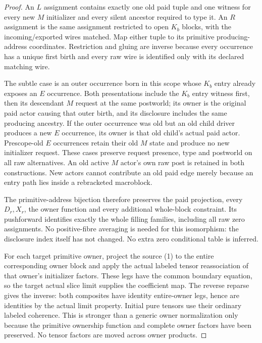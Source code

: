 \documentclass[11pt]{article}\usepackage{amsmath,amssymb,amsthm,geometry}\geometry{margin=1in}
\begin{document}
\begin{proof}
An $L$ assignment contains exactly one old paid tuple and one witness for every new $M$ initializer and every silent ancestor required to type it. An $R$ assignment is the same assignment restricted to open $K_b$ blocks, with the incoming/exported wires matched. Map either tuple to its primitive producing-address coordinates. Restriction and gluing are inverse because every occurrence has a unique first birth and every raw wire is identified only with its declared matching wire.

The subtle case is an outer occurrence born in this scope whose $K_b$ entry already exposes an $E$ occurrence. Both presentations include the $K_b$ entry witness first, then its descendant $M$ request at the same postworld; its owner is the original paid actor causing that outer birth, and its disclosure includes the same producing ancestry. If the outer occurrence was old but an old child driver produces a new $E$ occurrence, its owner is that old child's actual paid actor. Prescope-old $E$ occurrences retain their old $M$ state and produce no new initializer request. These cases preserve request presence, type and postworld on all raw alternatives. An old active $M$ actor's own raw post is retained in both constructions. New actors cannot contribute an old paid edge merely because an entry path lies inside a rebracketed macroblock.

The primitive-address bijection therefore preserves the paid projection, every $D_r,X_r$, the owner function and every additional whole-block constraint. Its pushforward identifies exactly the whole filling families, including all raw zero assignments. No positive-fibre averaging is needed for this isomorphism: the disclosure index itself has not changed. No extra zero conditional table is inferred.

For each target primitive owner, project the source (1) to the entire corresponding owner block and apply the actual labeled tensor reassociation of that owner's initializer factors. These legs have the common boundary equation, so the target actual slice limit supplies the coefficient map. The reverse reparse gives the inverse: both composites have identity entire-owner legs, hence are identities by the actual limit property. Initial pure tensors use their ordinary labeled coherence. This is stronger than a generic owner normalization only because the primitive ownership function and complete owner factors have been preserved. No tensor factors are moved across owner products.


\end{proof}
\end{document}
